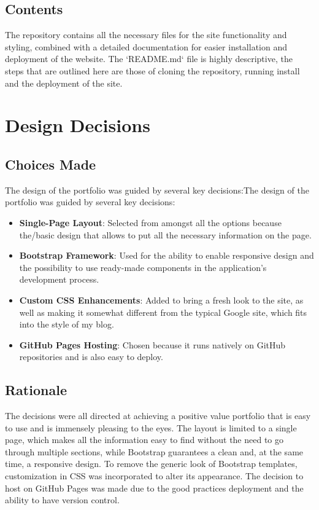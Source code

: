 \documentclass{article}
\begin{document}
\subsection{Contents}
The repository contains all the necessary files for the site functionality and styling, combined with a detailed documentation for easier installation and deployment of the website. The `README.md` file is highly descriptive, the steps that are outlined here are those of cloning the repository, running install and the deployment of the site.

\section{Design Decisions}
\subsection{Choices Made}
The design of the portfolio was guided by several key decisions:The design of the portfolio was guided by several key decisions:
\begin{itemize}
\item \textbf{Single-Page Layout}: Selected from amongst all the options because the/basic design that allows to put all the necessary information on the page.
\item \textbf{Bootstrap Framework}: Used for the ability to enable responsive design and the possibility to use ready-made components in the application’s development process.
\item \textbf{Custom CSS Enhancements}: Added to bring a fresh look to the site, as well as making it somewhat different from the typical Google site, which fits into the style of my blog.
\item \textbf{GitHub Pages Hosting}: Chosen because it runs natively on GitHub repositories and is also easy to deploy.
\end{itemize}

\subsection{Rationale}
The decisions were all directed at achieving a positive value portfolio that is easy to use and is immensely pleasing to the eyes. The layout is limited to a single page, which makes all the information easy to find without the need to go through multiple sections, while Bootstrap guarantees a clean and, at the same time, a responsive design. To remove the generic look of Bootstrap templates, customization in CSS was incorporated to alter its appearance. The decision to host on GitHub Pages was made due to the good practices deployment and the ability to have version control.
\end{document}
